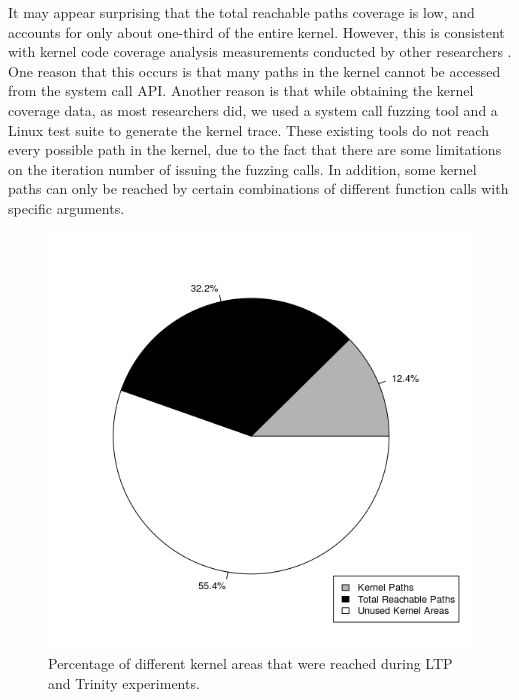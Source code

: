 It may appear surprising that the total reachable paths coverage is low,
and accounts for only about one-third of the entire kernel.  However,
this is consistent with kernel code coverage analysis
measurements conducted by other researchers \cite{LTP-Coverage}.
One reason that this occurs is that many paths
in the kernel cannot be accessed from the system call API. Another reason
is that
while obtaining the kernel coverage data, as most researchers did, we used
a system call fuzzing tool
and a Linux test suite to generate the kernel trace. These existing
tools do not reach every possible path in the kernel, due to
the fact that there are some limitations on the iteration number of issuing
the fuzzing calls. In addition, some kernel paths can only be reached by
certain combinations of different function calls with specific arguments.


\begin{figure}%
\centering
\includegraphics[width=1.0\columnwidth]{diagram/kernelcoverage.png}
\caption{Percentage of different kernel areas that were reached during
 LTP and Trinity experiments.}
\label{fig:coverage}
\end{figure}



